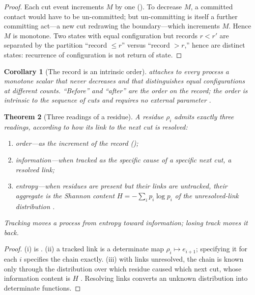 \documentclass[11pt,twocolumn,a4paper]{article}
\theoremstyle{dirthm}
\newtheorem{theorem}{Theorem}[section]
\newtheorem{corollary}[theorem]{Corollary}
\theoremstyle{definition}
\theoremstyle{remark}
\newcommand{\res}{\rho}
\newcommand{\rec}{M}
\begin{document}
\begin{proof}
Each cut event increments $\rec$ by one (). To decrease
$\rec$, a committed contact would have to be un-committed; but un-committing
is itself a further committing act---a new cut redrawing the boundary---which
increments $\rec$. Hence $\rec$ is monotone. Two states with equal
configuration but records $r<r'$ are separated by the partition ``record
$\le r$'' versus ``record $>r$,'' hence are distinct states: recurrence of
configuration is not return of state.
\end{proof}

\begin{corollary}[The record is an intrinsic order]
\label{cor:record-time}
 attaches to every process a monotone scalar that never
decreases and that distinguishes equal configurations at different counts.
``Before'' and ``after'' are the order on the record; the order is intrinsic
to the sequence of cuts and requires no external parameter
\citep{lamport1978}.
\end{corollary}

\begin{theorem}[Three readings of a residue]
\label{thm:three}
A residue $\res_i$ admits exactly three readings, according to how its link to
the next cut is resolved:
\begin{enumerate}[label=\textup{(\roman*)},leftmargin=2.0em,itemsep=1pt]
\item \emph{order}---as the increment of the record ();
\item \emph{information}---when tracked as the specific cause of a specific
next cut, a resolved link;
\item \emph{entropy}---when residues are present but their links are
untracked, their aggregate is the Shannon content $H=-\sum_i p_i\log p_i$ of
the unresolved-link distribution \citep{shannon1948,cover2006}.
\end{enumerate}
Tracking moves a process from entropy toward information; losing track moves
it back.
\end{theorem}

\begin{proof}
(i) is . (ii) a tracked link is a determinate map
$\res_i\mapsto e_{i+1}$; specifying it for each $i$ specifies the chain
exactly. (iii) with links unresolved, the chain is known only through the
distribution over which residue caused which next cut, whose information
content is $H$ \citep{shannon1948}. Resolving links converts an unknown
distribution into determinate functions.
\end{proof}
\end{document}
